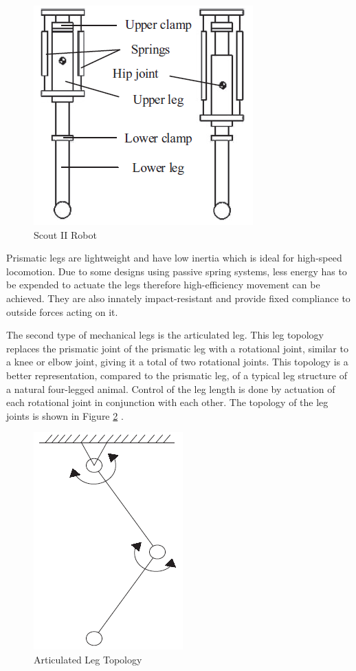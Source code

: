 \documentclass[english]{upeeei}
\begin{document}
\begin{figure}[H]
\begin{centering}
\includegraphics[width=0.3\columnwidth]{images/scout_ii}
\par\end{centering}
\caption{Scout II Robot\label{fig:scout-ii}}
\end{figure}

Prismatic legs are lightweight and have low inertia which is ideal for high-speed locomotion. Due to some designs using passive spring systems, less energy has to be expended to actuate the legs therefore high-efficiency movement can be achieved. They are also innately impact-resistant and provide fixed compliance to outside forces acting on it.

The second type of mechanical legs is the articulated leg. This leg topology replaces the prismatic joint of the prismatic leg with a rotational joint, similar to a knee or elbow joint, giving it a total of two rotational joints. This topology is a better representation, compared to the prismatic leg, of a typical leg structure of a natural four-legged animal. Control of the leg length is done by actuation of each rotational joint in conjunction with each other. The topology of the leg joints is shown in Figure \ref{fig:articulated-leg} \cite{quadrobotlegs}. 

\begin{figure}[H]
\begin{centering}
\includegraphics[width=0.3\columnwidth]{images/articulated_leg}
\par\end{centering}
\caption{Articulated Leg Topology\label{fig:articulated-leg}}
\end{figure}
\end{document}
